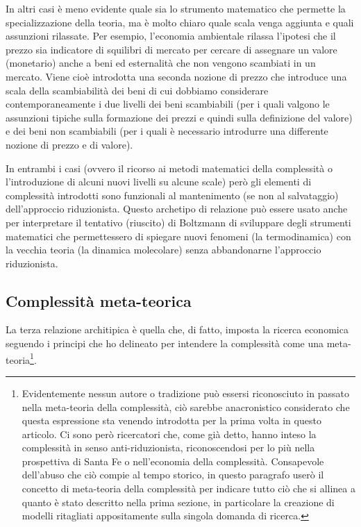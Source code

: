 \documentclass[a4paper, headings=standardclasses]{scrartcl}
\begin{document}
In altri casi è meno evidente quale sia lo strumento matematico che permette la specializzazione della teoria, ma è molto chiaro quale scala venga aggiunta e quali assunzioni rilassate. Per esempio, l'economia ambientale rilassa l'ipotesi che il prezzo sia indicatore di squilibri di mercato per cercare di assegnare un valore (monetario) anche a beni ed esternalità che non vengono scambiati in un mercato.
Viene cioè introdotta una seconda nozione di prezzo che introduce una scala della scambiabilità dei beni di cui dobbiamo considerare contemporaneamente i due livelli dei beni scambiabili (per i quali valgono le assunzioni tipiche sulla formazione dei prezzi e quindi sulla definizione del valore) e dei beni non scambiabili (per i quali è necessario introdurre una differente nozione di prezzo e di valore).

In entrambi i casi (ovvero il ricorso ai metodi matematici della complessità o l'introduzione di alcuni nuovi livelli su alcune scale) però gli elementi di complessità introdotti sono funzionali al mantenimento (se non al salvataggio) dell'approccio riduzionista.
Questo archetipo di relazione può essere usato anche per interpretare il tentativo (riuscito) di Boltzmann di sviluppare degli strumenti matematici che permettessero di spiegare nuovi fenomeni (la termodinamica) con la vecchia teoria (la dinamica molecolare) senza abbandonarne l'approccio riduzionista.

\subsection{Complessità meta-teorica}
La terza relazione architipica è quella che, di fatto, imposta la ricerca economica seguendo i principi che ho delineato per intendere la complessità come una meta-teoria\footnote{Evidentemente nessun autore o tradizione può essersi riconosciuto in passato nella meta-teoria della complessità, ciò sarebbe anacronistico considerato che questa espressione sta venendo introdotta per la prima volta in questo articolo. Ci sono però ricercatori che, come già detto, hanno inteso la complessità in senso anti-riduzionista, riconoscendosi per lo più nella prospettiva di Santa Fe o nell'economia della complessità. Consapevole dell'abuso che ciò compie al tempo storico, in questo paragrafo userò il concetto di meta-teoria della complessità per indicare tutto ciò che si allinea a quanto è stato descritto nella prima sezione, in particolare la creazione di modelli ritagliati appositamente sulla singola domanda di ricerca.}.
\end{document}
